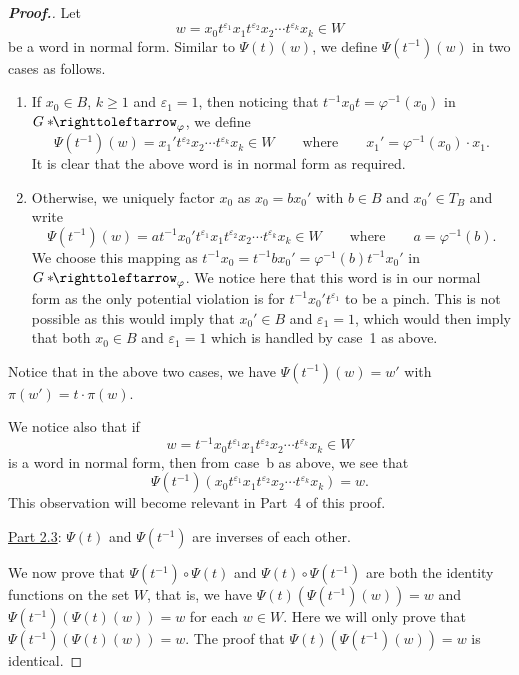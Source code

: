 \documentclass[11pt,a4paper,reqno]{amsart}
\theoremstyle{plain}
\theoremstyle{definition}
\theoremstyle{definition}
\renewcommand\geq\geqslant
\newenvironment{myproof}{\begin{proof}[\normalfont\bfseries Proof.]}{\end{proof}}
\newcommand\hnn{*\!\!\righttoleftarrow}
\begin{document}
\begin{myproof}
	\smallskip
	\noindent
	Let
	\[
		w = x_0 t^{\varepsilon_1} x_1 t^{\varepsilon_2} x_2 \cdots t^{\varepsilon_k} x_k \in W
	\]
	be a word in normal form. Similar to $\Psi(t)(w)$, we define $\Psi(t^{-1})(w)$ in two cases as follows.
	\begin{enumerate}[label=\alph*)]
		\item If $x_0 \in B$, $k\geq 1$ and $\varepsilon_1 = 1$, then noticing that $t^{-1} x_0 t = \varphi^{-1}(x_0)$ in $G\hnn_\varphi$, we define
		      \[
			      \Psi(t^{-1})(w)
			      =
			      x_1' t^{\varepsilon_2} x_2 \cdots t^{\varepsilon_k} x_k \in W
			      \qquad
			      \text{where}
			      \qquad
			      x_1' = \varphi^{-1}(x_0) \cdot x_1.
		      \]
		      It is clear that the above word is in normal form as required.
		\item Otherwise, we uniquely factor $x_0$ as $x_0 = b x_0'$ with $b\in B$ and $x_0'\in T_B$ and write
		      \[
			      \Psi(t^{-1})(w)
			      =
			      a t^{-1} x_0' t^{\varepsilon_1} x_1 t^{\varepsilon_2} x_2 \cdots t^{\varepsilon_k} x_k \in W
			      \qquad
			      \text{where}
			      \qquad
			      a=\varphi^{-1}(b).
		      \]
		      We choose this mapping as $t^{-1}x_0 = t^{-1}bx_0' = \varphi^{-1}(b)t^{-1}x_0'$ in $G\hnn_\varphi$.
		      We notice here that this word is in our normal form as the only potential violation is for $t^{-1}x_0' t^{\varepsilon_1}$ to be a pinch.
		      This is not possible as this would imply that $x_0' \in B$ and $\varepsilon_1=1$, which would then imply that both $x_0\in B$ and $\varepsilon_1=1$ which is handled by case~1 as above.
	\end{enumerate}
	Notice that in the above two cases, we have $\Psi(t^{-1})(w) = w'$ with $\pi(w') = t\cdot \pi(w)$.

	We notice also that if
	\[
		w=t^{-1} x_0 t^{\varepsilon_1} x_1 t^{\varepsilon_2} x_2 \cdots t^{\varepsilon_k} x_k\in W
	\]
	is a word in normal form, then from case~b as above, we see that
	\[
		\Psi(t^{-1})(x_0 t^{\varepsilon_1} x_1 t^{\varepsilon_2} x_2 \cdots t^{\varepsilon_k} x_k)
		=
		w.
	\]
	This observation will become relevant in Part~4 of this proof.

	\medskip
	\noindent
	\underline{Part 2.3}: $\Psi(t)$ and $\Psi(t^{-1})$ are inverses of each other.
	\nopagebreak

	\smallskip
	\noindent
	We now prove that $\Psi(t^{-1})\circ \Psi(t)$ and $\Psi(t)\circ \Psi(t^{-1})$ are both the identity functions on the set $W$, that is, we have $\Psi(t)(\Psi(t^{-1})(w))=w$ and $\Psi(t^{-1})(\Psi(t)(w))=w$ for each $w \in W$.
	Here we will only prove that $\Psi(t^{-1})(\Psi(t)(w))=w$. The proof that $\Psi(t)(\Psi(t^{-1})(w))=w$ is identical.


\end{myproof}
\end{document}

